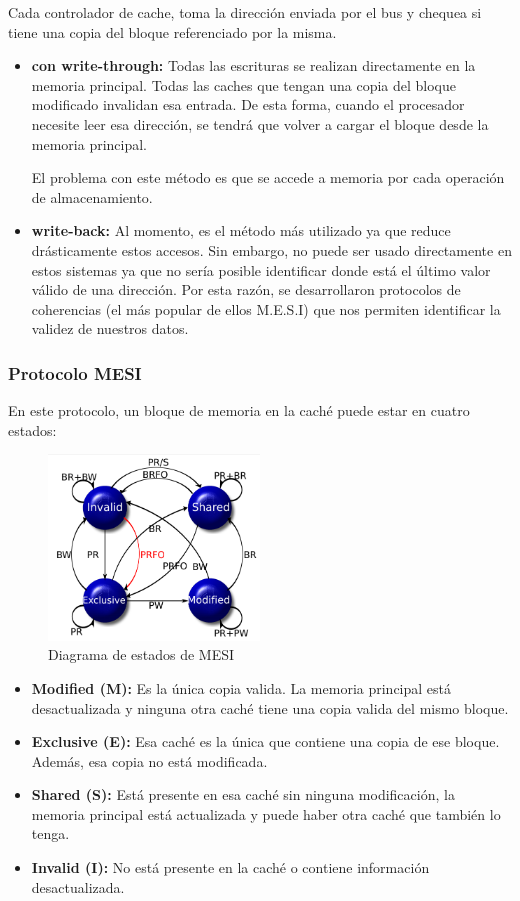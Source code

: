 Cada controlador de cache, toma la dirección enviada por el bus y chequea si tiene una copia del bloque referenciado por la misma.

\begin{itemize}
	\item \textbf{con write-through:} Todas las escrituras se realizan directamente en la memoria principal. Todas las caches que tengan una copia del bloque modificado invalidan esa entrada. De esta forma, cuando el procesador necesite leer esa dirección, se tendrá que volver a cargar el bloque desde la memoria principal.
	
	El problema con este método es que se accede a memoria por cada operación de almacenamiento.
	
	\item  \textbf{write-back:} Al momento, es el método más utilizado ya que reduce drásticamente estos accesos. Sin embargo, no puede ser usado directamente en estos sistemas ya que no sería posible identificar donde está el último valor válido de una dirección. Por esta razón, se desarrollaron protocolos de coherencias (el más popular de ellos M.E.S.I) que nos permiten identificar la validez de nuestros datos.
\end{itemize}

\subsubsection{Protocolo MESI}
En este protocolo, un bloque de memoria en la caché puede estar en cuatro estados:

\begin{figure}[ht]
	\centering
	\includegraphics[width=0.5\textwidth]{imagenes/mesi-state-graph}
	\caption{Diagrama de estados de MESI}
	\label{fig:mesiDiagram}
\end{figure}

\begin{itemize}
	\item \textbf{Modified (M):} Es la única copia valida. La memoria principal está desactualizada y ninguna otra caché tiene una copia valida del mismo bloque.
	\item \textbf{Exclusive (E):} Esa caché es la única que contiene una copia de ese bloque. Además, esa copia no está modificada.
	\item \textbf{Shared (S):} Está presente en esa caché sin ninguna modificación, la memoria principal está actualizada y puede haber otra caché que también lo tenga.
	\item \textbf{Invalid (I):} No está presente en la caché o contiene información desactualizada.
\end{itemize}

